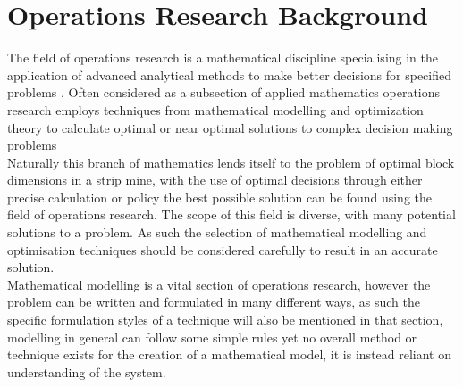 \section{Operations Research Background}
The field of operations research is a mathematical discipline specialising in the application of advanced analytical methods to make better decisions for specified problems \cite{Intro2or}. Often considered as a subsection of applied mathematics operations research employs techniques from mathematical modelling and optimization theory to calculate optimal or near optimal solutions to complex decision making problems\cite{abtOR} \\ Naturally this branch of mathematics lends itself to the problem of optimal block dimensions in a strip mine, with the use of optimal decisions through either precise calculation or policy the best possible solution can be found using the field of operations research. The scope of this field is diverse, with many potential solutions to a problem. As such the selection of mathematical modelling and optimisation techniques should be considered carefully to result in an accurate solution. 
\\
Mathematical modelling is a vital section of operations research, however the problem can be written and formulated in many different ways, as such the specific formulation styles of a technique will also be mentioned in that section, modelling in general can follow some simple rules yet no overall method or technique exists for the creation of a mathematical model, it is instead reliant on understanding of the system. 

